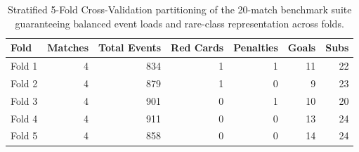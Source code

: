 \begin{table}[t]
\centering
\small
\caption{Stratified 5-Fold Cross-Validation partitioning of the 20-match benchmark suite guaranteeing balanced event loads and rare-class representation across folds.}
\label{tab:twenty_matches_5fold_stratification}
\begin{tabular}{lrrrrrr}
\toprule
\textbf{Fold} & \textbf{Matches} & \textbf{Total Events} & \textbf{Red Cards} & \textbf{Penalties} & \textbf{Goals} & \textbf{Subs} \\
\midrule
Fold 1 & 4 & 834 & 1 & 1 & 11 & 22 \\
Fold 2 & 4 & 879 & 1 & 0 & 9 & 23 \\
Fold 3 & 4 & 901 & 0 & 1 & 10 & 20 \\
Fold 4 & 4 & 911 & 0 & 0 & 13 & 24 \\
Fold 5 & 4 & 858 & 0 & 0 & 14 & 24 \\
\bottomrule
\end{tabular}
\end{table}
